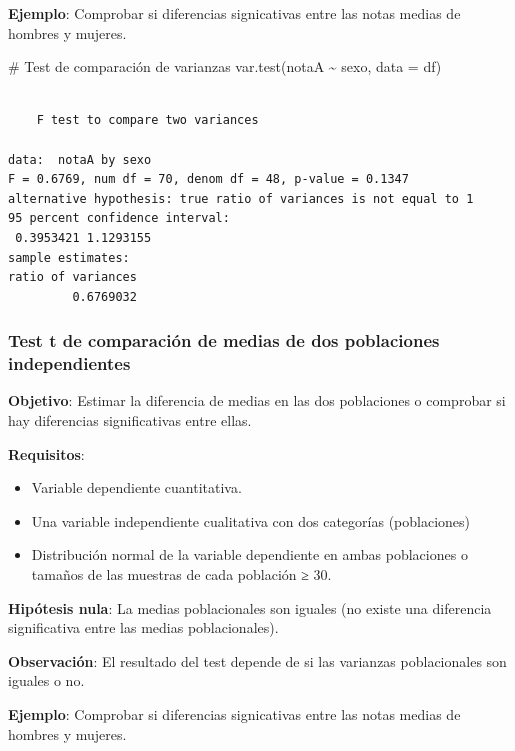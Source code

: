 \documentclass[
  spanish,
  a4paper,
]{scrreport}
\newenvironment{Shaded}{\begin{snugshade}}{\end{snugshade}}
\newcommand{\AttributeTok}[1]{\textcolor[rgb]{0.40,0.45,0.13}{#1}}
\newcommand{\CommentTok}[1]{\textcolor[rgb]{0.37,0.37,0.37}{#1}}
\newcommand{\FunctionTok}[1]{\textcolor[rgb]{0.28,0.35,0.67}{#1}}
\newcommand{\NormalTok}[1]{\textcolor[rgb]{0.00,0.23,0.31}{#1}}
\newcommand{\SpecialCharTok}[1]{\textcolor[rgb]{0.37,0.37,0.37}{#1}}
\providecommand{\tightlist}{%
  \setlength{\itemsep}{0pt}\setlength{\parskip}{0pt}}
\theoremstyle{definition}
\theoremstyle{definition}
\theoremstyle{remark}
\begin{document}
\textbf{Ejemplo}: Comprobar si diferencias signicativas entre las notas
medias de hombres y mujeres.

\begin{Shaded}
\begin{Highlighting}[]
\CommentTok{\# Test de comparación de varianzas}
\FunctionTok{var.test}\NormalTok{(notaA }\SpecialCharTok{\textasciitilde{}}\NormalTok{ sexo, }\AttributeTok{data =}\NormalTok{ df)}
\end{Highlighting}
\end{Shaded}

\begin{verbatim}

    F test to compare two variances

data:  notaA by sexo
F = 0.6769, num df = 70, denom df = 48, p-value = 0.1347
alternative hypothesis: true ratio of variances is not equal to 1
95 percent confidence interval:
 0.3953421 1.1293155
sample estimates:
ratio of variances 
         0.6769032 
\end{verbatim}

\subsubsection{Test t de comparación de medias de dos poblaciones
independientes}\label{test-t-de-comparaciuxf3n-de-medias-de-dos-poblaciones-independientes}

\textbf{Objetivo}: Estimar la diferencia de medias en las dos
poblaciones o comprobar si hay diferencias significativas entre ellas.

\textbf{Requisitos}:

\begin{itemize}
\tightlist
\item
  Variable dependiente cuantitativa.
\item
  Una variable independiente cualitativa con dos categorías
  (poblaciones)
\item
  Distribución normal de la variable dependiente en ambas poblaciones o
  tamaños de las muestras de cada población ≥ 30.
\end{itemize}

\textbf{Hipótesis nula}: La medias poblacionales son iguales (no existe
una diferencia significativa entre las medias poblacionales).

\textbf{Observación}: El resultado del test depende de si las varianzas
poblacionales son iguales o no.

\textbf{Ejemplo}: Comprobar si diferencias signicativas entre las notas
medias de hombres y mujeres.
\end{document}
